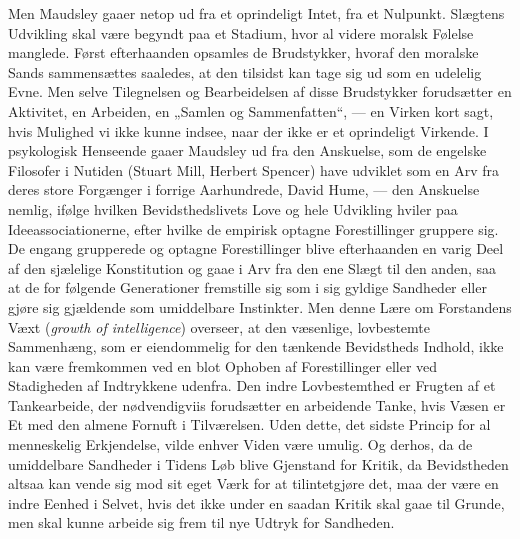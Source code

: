 \documentclass[12pt,a4paper,openany]{book}
\newcommand{\opage}[1]{\marginnote{\footnotesize\textit{[#1]}}}
\begin{document}
\opage{328}Men Maudsley gaaer netop ud fra et oprindeligt Intet,
fra et Nulpunkt. Slægtens Udvikling skal være begyndt paa
et Stadium, hvor al videre moralsk Følelse manglede. Først
efterhaanden opsamles de Brudstykker, hvoraf den moralske
Sands sammensættes saaledes, at den tilsidst kan tage sig
ud som en udelelig Evne. Men selve Tilegnelsen og Bearbeidelsen
af disse Brudstykker forudsætter en Aktivitet, en
Arbeiden, en „Samlen og Sammenfatten“, --- en Virken
kort sagt, hvis Mulighed vi ikke kunne indsee, naar der ikke
er et oprindeligt Virkende. I psykologisk Henseende gaaer
Maudsley ud fra den Anskuelse, som de engelske Filosofer
i Nutiden (Stuart Mill, Herbert Spencer) have udviklet
som en Arv fra deres store Forgænger i forrige Aarhundrede,
David Hume, --- den Anskuelse nemlig, ifølge hvilken Bevidsthedslivets
Love og hele Udvikling hviler paa Ideeassociationerne,
efter hvilke de empirisk optagne Forestillinger gruppere
sig. De engang grupperede og optagne Forestillinger
blive efterhaanden en varig Deel af den sjælelige Konstitution
og gaae i Arv fra den ene Slægt til den anden, saa at de
for følgende Generationer fremstille sig som i sig gyldige Sandheder
eller gjøre sig gjældende som umiddelbare Instinkter.
Men denne Lære om Forstandens Væxt (\textit{growth of intelligence})
overseer, at den væsenlige, lovbestemte Sammenhæng,
som er eiendommelig for den tænkende Bevidstheds Indhold,
ikke kan være fremkommen ved en blot Ophoben af Forestillinger
eller ved Stadigheden af Indtrykkene udenfra. Den
indre Lovbestemthed er Frugten af et Tankearbeide, der nødvendigviis
forudsætter en arbeidende Tanke, hvis Væsen er
Et med den almene Fornuft i Tilværelsen. Uden dette, det
sidste Princip for al menneskelig Erkjendelse, vilde enhver
Viden være umulig. Og derhos, da de umiddelbare Sandheder
i Tidens Løb blive Gjenstand for Kritik, da Bevidstheden
altsaa kan vende sig mod sit eget Værk for at tilintetgjøre
det, maa der være en indre Eenhed i Selvet, hvis det ikke
under en saadan Kritik skal gaae til Grunde, men skal kunne
arbeide sig frem til nye Udtryk for Sandheden.
\end{document}
